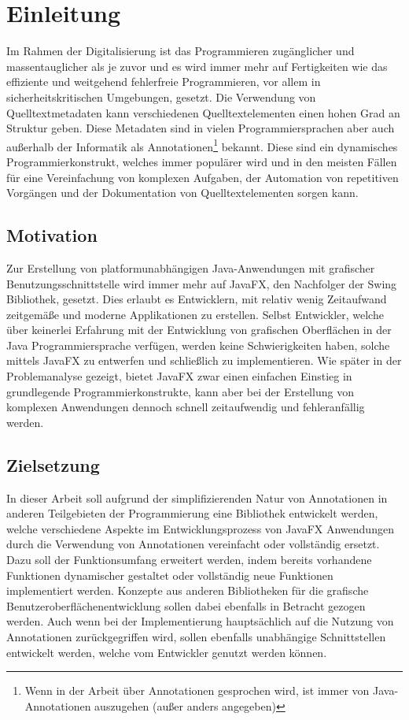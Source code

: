 \chapter{Einleitung}
\label{einleitung}
Im Rahmen der Digitalisierung ist das Programmieren zugänglicher und massentauglicher als je zuvor und es wird immer mehr auf Fertigkeiten wie das effiziente und weitgehend fehlerfreie Programmieren, vor allem in sicherheitskritischen Umgebungen, gesetzt. Die Verwendung von Quelltextmetadaten kann verschiedenen Quelltextelementen einen hohen Grad an Struktur geben. Diese Metadaten sind in vielen Programmiersprachen aber auch außerhalb der Informatik als Annotationen\footnote{Wenn in der Arbeit über Annotationen gesprochen wird, ist immer von Java-Annotationen auszugehen (außer anders angegeben)} bekannt. Diese sind ein dynamisches Programmierkonstrukt, welches immer populärer wird und in den meisten Fällen für eine Vereinfachung von komplexen Aufgaben, der Automation von repetitiven Vorgängen und der Dokumentation von Quelltextelementen sorgen kann.
\section{Motivation}
\label{motivation}
Zur Erstellung von platformunabhängigen Java-Anwendungen mit grafischer Benutzungsschnittstelle wird immer mehr auf JavaFX, den Nachfolger der Swing Bibliothek, gesetzt. Dies erlaubt es Entwicklern, mit relativ wenig Zeitaufwand zeitgemäße und moderne Applikationen zu erstellen. Selbst Entwickler, welche über keinerlei Erfahrung mit der Entwicklung von grafischen Oberflächen in der Java Programmiersprache verfügen, werden keine Schwierigkeiten haben, solche mittels JavaFX zu entwerfen und schließlich zu implementieren. Wie später in der Problemanalyse gezeigt, bietet JavaFX zwar einen einfachen Einstieg in grundlegende Programmierkonstrukte, kann aber bei der Erstellung von komplexen Anwendungen dennoch schnell zeitaufwendig und fehleranfällig werden.
\section{Zielsetzung}
\label{zielsetzung}
In dieser Arbeit soll aufgrund der simplifizierenden Natur von Annotationen in anderen Teilgebieten der Programmierung eine Bibliothek entwickelt werden, welche verschiedene Aspekte im Entwicklungsprozess von JavaFX Anwendungen durch die Verwendung von Annotationen vereinfacht oder vollständig ersetzt. Dazu soll der Funktionsumfang erweitert werden, indem bereits vorhandene Funktionen dynamischer gestaltet oder vollständig neue Funktionen implementiert werden. Konzepte aus anderen Bibliotheken für die grafische Benutzeroberflächenentwicklung sollen dabei ebenfalls in Betracht gezogen werden. Auch wenn bei der Implementierung hauptsächlich auf die Nutzung von Annotationen zurückgegriffen wird, sollen ebenfalls unabhängige Schnittstellen entwickelt werden, welche vom Entwickler genutzt werden können.
